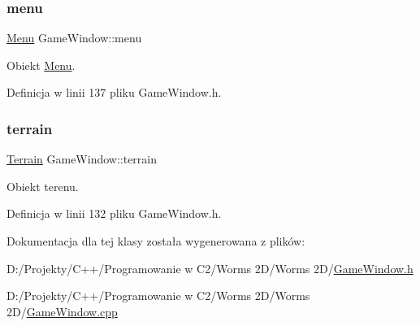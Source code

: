\subsubsection{\texorpdfstring{menu}{menu}}
{\footnotesize\ttfamily \mbox{\hyperlink{class_menu}{Menu}} Game\+Window\+::menu}



Obiekt \mbox{\hyperlink{class_menu}{Menu}}. 



Definicja w linii 137 pliku Game\+Window.\+h.

\mbox{\label{class_game_window_ab5d02e9738d1f7f3fea4cd146172cf11}} 
\subsubsection{\texorpdfstring{terrain}{terrain}}
{\footnotesize\ttfamily \mbox{\hyperlink{class_terrain}{Terrain}} Game\+Window\+::terrain}



Obiekt terenu. 



Definicja w linii 132 pliku Game\+Window.\+h.



Dokumentacja dla tej klasy została wygenerowana z plików\+:\begin{DoxyCompactItemize}
\item 
D\+:/\+Projekty/\+C++/\+Programowanie w C2/\+Worms 2\+D/\+Worms 2\+D/\mbox{\hyperlink{_game_window_8h}{Game\+Window.\+h}}\item 
D\+:/\+Projekty/\+C++/\+Programowanie w C2/\+Worms 2\+D/\+Worms 2\+D/\mbox{\hyperlink{_game_window_8cpp}{Game\+Window.\+cpp}}\end{DoxyCompactItemize}

